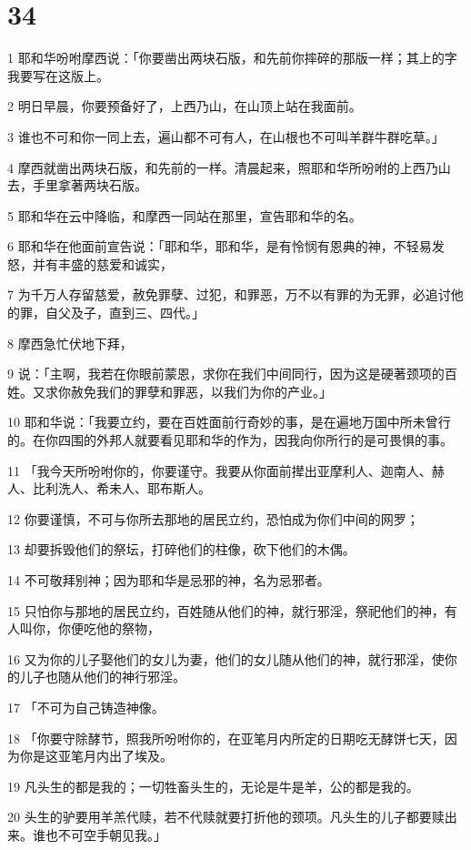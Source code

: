\chapter{34}

\par 1 耶和华吩咐摩西说：「你要凿出两块石版，和先前你摔碎的那版一样；其上的字我要写在这版上。
\par 2 明日早晨，你要预备好了，上西乃山，在山顶上站在我面前。
\par 3 谁也不可和你一同上去，遍山都不可有人，在山根也不可叫羊群牛群吃草。」
\par 4 摩西就凿出两块石版，和先前的一样。清晨起来，照耶和华所吩咐的上西乃山去，手里拿著两块石版。
\par 5 耶和华在云中降临，和摩西一同站在那里，宣告耶和华的名。
\par 6 耶和华在他面前宣告说：「耶和华，耶和华，是有怜悯有恩典的神，不轻易发怒，并有丰盛的慈爱和诚实，
\par 7 为千万人存留慈爱，赦免罪孽、过犯，和罪恶，万不以有罪的为无罪，必追讨他的罪，自父及子，直到三、四代。」
\par 8 摩西急忙伏地下拜，
\par 9 说：「主啊，我若在你眼前蒙恩，求你在我们中间同行，因为这是硬著颈项的百姓。又求你赦免我们的罪孽和罪恶，以我们为你的产业。」
\par 10 耶和华说：「我要立约，要在百姓面前行奇妙的事，是在遍地万国中所未曾行的。在你四围的外邦人就要看见耶和华的作为，因我向你所行的是可畏惧的事。
\par 11 「我今天所吩咐你的，你要谨守。我要从你面前撵出亚摩利人、迦南人、赫人、比利洗人、希未人、耶布斯人。
\par 12 你要谨慎，不可与你所去那地的居民立约，恐怕成为你们中间的网罗；
\par 13 却要拆毁他们的祭坛，打碎他们的柱像，砍下他们的木偶。
\par 14 不可敬拜别神；因为耶和华是忌邪的神，名为忌邪者。
\par 15 只怕你与那地的居民立约，百姓随从他们的神，就行邪淫，祭祀他们的神，有人叫你，你便吃他的祭物，
\par 16 又为你的儿子娶他们的女儿为妻，他们的女儿随从他们的神，就行邪淫，使你的儿子也随从他们的神行邪淫。
\par 17 「不可为自己铸造神像。
\par 18 「你要守除酵节，照我所吩咐你的，在亚笔月内所定的日期吃无酵饼七天，因为你是这亚笔月内出了埃及。
\par 19 凡头生的都是我的；一切牲畜头生的，无论是牛是羊，公的都是我的。
\par 20 头生的驴要用羊羔代赎，若不代赎就要打折他的颈项。凡头生的儿子都要赎出来。谁也不可空手朝见我。」
